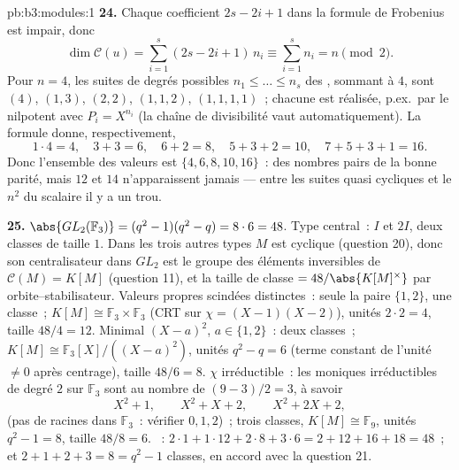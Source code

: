 \begin{solution}{pb:b3:modules:1}
\textbf{24.} Chaque coefficient $2s - 2i + 1$ dans la formule
de Frobenius est impair, donc
\[
\dim\mathcal C(u) = \sum_{i=1}^{s}(2s - 2i + 1)\,n_i
\equiv \sum_{i=1}^{s} n_i = n \pmod 2 .
\]
Pour $n = 4$, les suites de degrés possibles $n_1 \leq \dots
\leq n_s$ des , sommant à $4$, sont $(4)$,
$(1, 3)$, $(2, 2)$, $(1, 1, 2)$, $(1, 1, 1, 1)$~; chacune est
réalisée, p.ex.\ par le nilpotent avec $P_i = X^{n_i}$ (la
chaîne de divisibilité vaut automatiquement). La formule
donne, respectivement,
\[
1\cdot4 = 4, \quad 3 + 3 = 6, \quad 6 + 2 = 8, \quad
5 + 3 + 2 = 10, \quad 7 + 5 + 3 + 1 = 16 .
\]
Donc l'ensemble des valeurs est $\{4, 6, 8, 10, 16\}$~: des
nombres pairs de la bonne parité, mais $12$ et $14$ n'apparaissent
jamais --- entre les suites quasi cycliques et le $n^2$ du
scalaire il y a un trou.

\textbf{25.} $\abs{GL_2(\mathbb F_3)} = (q^2 - 1)(q^2 - q) =
8 \cdot 6 = 48$. Type central~: $I$ et $2I$, deux classes de
taille $1$. Dans les trois autres types $M$ est cyclique
(question 20), donc son centralisateur dans $GL_2$ est le
groupe des éléments inversibles de $\mathcal C(M) = K[M]$
(question 11), et la taille de classe $=48/\abs{K[M]^\times}$
par orbite--stabilisateur. Valeurs propres scindées
distinctes~: seule la paire $\{1, 2\}$, une classe~; $K[M]
\cong \mathbb F_3 \times \mathbb F_3$ (CRT sur $\chi = (X-1)
(X-2)$), unités $2 \cdot 2 = 4$, taille $48/4 = 12$. Minimal
$(X - a)^2$, $a \in \{1, 2\}$~: deux classes~; $K[M] \cong
\mathbb F_3[X]/((X-a)^2)$, unités $q^2 - q = 6$ (terme
constant de l'unité $\neq 0$ après centrage), taille $48/6 =
8$. $\chi$ irréductible~: les moniques irréductibles de degré
$2$ sur $\mathbb F_3$ sont au nombre de $(9 - 3)/2 = 3$, à
savoir
\[
X^2 + 1, \qquad X^2 + X + 2, \qquad X^2 + 2X + 2,
\]
(pas de racines dans $\mathbb F_3$~: vérifier $0, 1, 2$)~;
trois classes, $K[M] \cong \mathbb F_9$, unités $q^2 - 1 = 8$,
taille $48/8 = 6$. ~: $2\cdot1 + 1\cdot12
+ 2\cdot8 + 3\cdot6 = 2 + 12 + 16 + 18 = 48$~; et $2 + 1 + 2 +
3 = 8 = q^2 - 1$ classes, en accord avec la question 21.
\end{solution}
